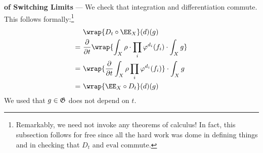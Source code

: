     \textbf{of Switching Limits} ---
    We check that integration and differentiation commute.
    This follows formally:\footnote{
        Remarkably, we need not invoke any theorems of calculus!  In fact, this
        subsection follows for free since all the hard work was dome in
        defining things and in checking that $D_t$ and $\text{eval}$ commute.
    }
    \begin{align*}
        &~\wrap{D_t \circ \EE_X}(d)(g) 
        \\
        = 
        &~\frac{\partial}{\partial t} \wrap{
            \int_X \rho \cdot \prod_i \varphi^{d_i}(f_i)
            \cdot \int_X g
        } 
        \\
        = 
        &~\wrap{
            \frac{\partial}{\partial t} \int_X \rho \prod_i \varphi^{d_i}(f_i)
        } \cdot \int_X g
        \\
        =
        &~\wrap{\EE_X \circ D_t}(d)(g) 
    \end{align*}
    We used that $g\in\frak G$ does not depend on $t$.

